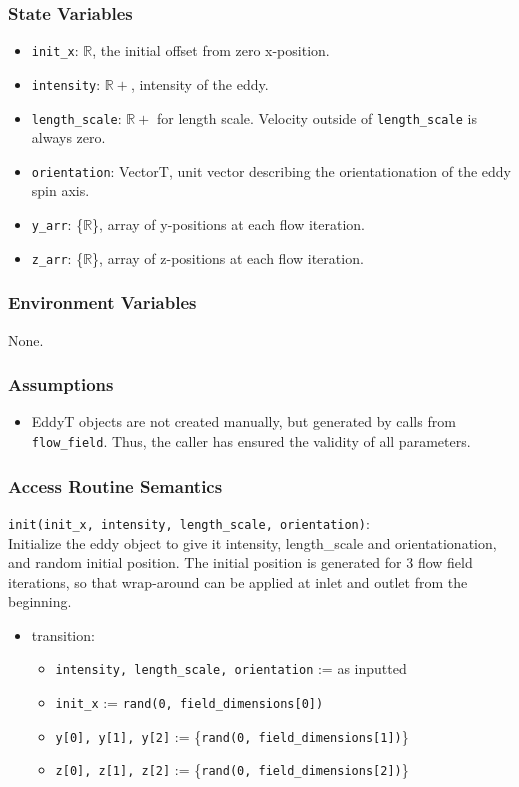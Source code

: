 \documentclass[12pt, titlepage]{article}
\begin{document}
\subsubsection{State Variables}
\begin{itemize}
  \item \texttt{init\_x}: $\mathbb{R}$, the initial offset from zero x-position.
  \item \texttt{intensity}: $\mathbb{R+}$, intensity of the eddy.
  \item \texttt{length\_scale}: $\mathbb{R+}$ for length scale. Velocity outside of \texttt{length\_scale} is always zero.
  \item \texttt{orientation}: VectorT, unit vector describing the orientationation of the eddy spin axis.
  \item \texttt{y\_arr}: \{$\mathbb{R}$\}, array of y-positions at each flow iteration.
  \item \texttt{z\_arr}: \{$\mathbb{R}$\}, array of z-positions at each flow iteration.
\end{itemize}

\subsubsection{Environment Variables}
None.

\subsubsection{Assumptions}
\begin{itemize}
  \item EddyT objects are not created manually, but generated by calls from \texttt{flow\_field}. Thus, the caller has ensured the validity of all parameters.
\end{itemize}

\subsubsection{Access Routine Semantics}

\noindent \texttt{init(init\_x, intensity, length\_scale, orientation)}:\\
Initialize the eddy object to give it intensity, length\_scale and orientationation, and random initial position. The initial position is generated for 3 flow field iterations, so that wrap-around can be applied at inlet and outlet from the beginning.
\begin{itemize}
\item transition: 
  \begin{itemize}
  \item \texttt{intensity, length\_scale, orientation} := as inputted
  \item \texttt{init\_x} := \texttt{rand(0, field\_dimensions[0])}
  \item \texttt{y[0], y[1], y[2]} := \{\texttt{rand(0, field\_dimensions[1])}\}
  \item \texttt{z[0], z[1], z[2]} := \{\texttt{rand(0, field\_dimensions[2])}\}
  \end{itemize}
\end{itemize}
\end{document}
